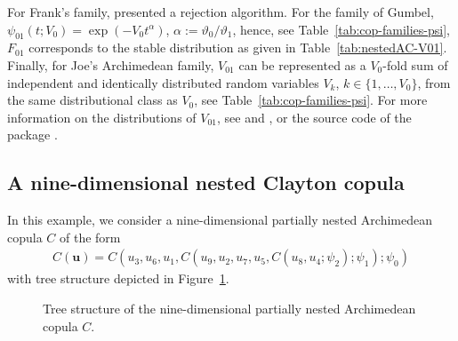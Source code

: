 \documentclass[nojss,article]{jss}
\theoremstyle{mythmstyle}
\newcommand*{\vt}{\vartheta}
\newcommand*{\setcapwidth}[1]{}
\begin{document}
For Frank's family, \citet{hofert2010a} presented a rejection algorithm.
For the family of Gumbel, $\psi_{01}(t;V_0)=\exp(-V_0t^\alpha)$,
$\alpha:=\vt_0/\vt_1$, hence, see Table~\ref{tab:cop-families-psi}, $F_{01}$ corresponds
to the stable distribution as given in Table~\ref{tab:nestedAC-V01}. Finally, for
Joe's Archimedean family, $V_{01}$ can be represented as a $V_0$-fold sum of
independent and identically distributed random variables $V_k$,
$k\in\{1,\dots,V_0\}$, from the same distributional class as $V_0$, see
Table~\ref{tab:cop-families-psi}. For more information on the distributions of $V_{01}$,
see \citet{hofert2010a} and \citet{hofert2010c}, or the source code of
the package .

\subsection{A nine-dimensional nested Clayton copula}
In this example, we consider a nine-dimensional partially nested Archimedean
copula $C$ of the form
\begin{align*}
 C(\bm{u})=C(u_3,u_6,u_1,C(u_9,u_2,u_7,u_5,C(u_8,u_4;\psi_2);\psi_1);\psi_0)
\end{align*}
with tree structure depicted in Figure~\ref{fig:NAC_9d}.
\begin{figure}[htbp]
 \centering
\setcapwidth{\textwidth}%
\caption{Tree structure of the nine-dimensional partially nested Archimedean
copula $C$.}
\label{fig:NAC_9d}
\end{figure}
\end{document}
